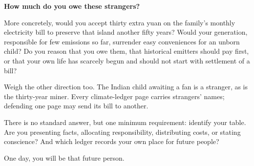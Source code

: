 \textbf{How much do you owe these strangers?}

More concretely, would you accept thirty extra yuan on the family's monthly electricity bill to preserve that island another fifty years? Would your generation, responsible for few emissions so far, surrender easy conveniences for an unborn child? Do you reason that you owe them, that historical emitters should pay first, or that your own life has scarcely begun and should not start with settlement of a bill?

Weigh the other direction too. The Indian child awaiting a fan is a stranger, as is the thirty-year miner. Every climate-ledger page carries strangers' names; defending one page may send its bill to another.

There is no standard answer, but one minimum requirement: identify your table. Are you presenting facts, allocating responsibility, distributing costs, or stating conscience? And which ledger records your own place for future people?

One day, you will be that future person.

